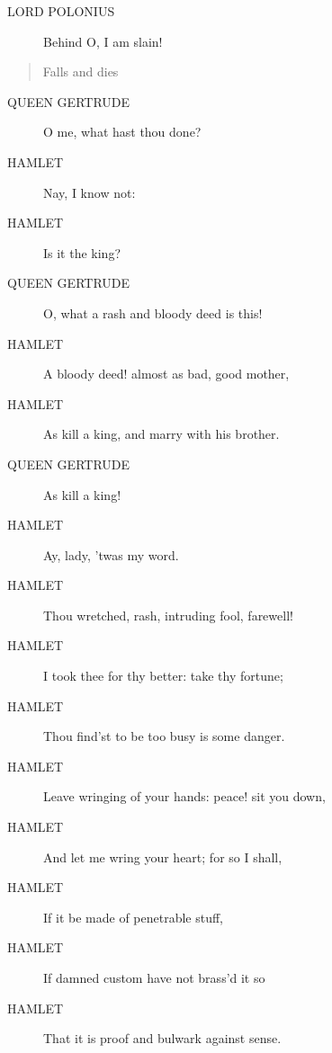 \documentclass{article}
\begin{document}
\begin{description}
            
\item[LORD POLONIUS] 
               Behind  O, I am slain!
\end{description}
          
\begin{quote}
Falls and dies
\end{quote}
          
\begin{description}
            
\item[QUEEN GERTRUDE] O me, what hast thou done?
\end{description}
          
\begin{description}
            
\item[HAMLET] Nay, I know not:
\item[HAMLET] Is it the king?
\end{description}
          
\begin{description}
            
\item[QUEEN GERTRUDE] O, what a rash and bloody deed is this!
\end{description}
          
\begin{description}
            
\item[HAMLET] A bloody deed! almost as bad, good mother,
\item[HAMLET] As kill a king, and marry with his brother.
\end{description}
          
\begin{description}
            
\item[QUEEN GERTRUDE] As kill a king!
\end{description}
          
\begin{description}
            
\item[HAMLET] Ay, lady, 'twas my word.
\item[HAMLET] Thou wretched, rash, intruding fool, farewell!
\item[HAMLET] I took thee for thy better: take thy fortune;
\item[HAMLET] Thou find'st to be too busy is some danger.
\item[HAMLET] Leave wringing of your hands: peace! sit you down,
\item[HAMLET] And let me wring your heart; for so I shall,
\item[HAMLET] If it be made of penetrable stuff,
\item[HAMLET] If damned custom have not brass'd it so
\item[HAMLET] That it is proof and bulwark against sense.
\end{description}
          
\end{document}
